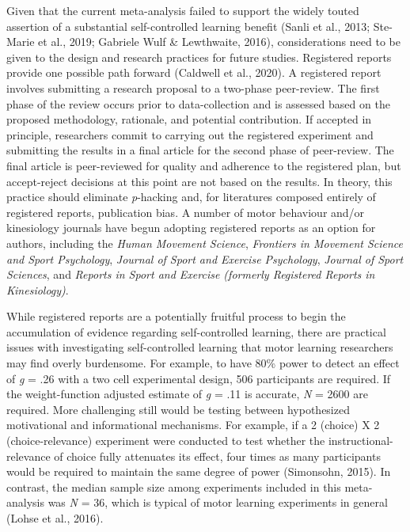 \documentclass[
  english,
  man,floatsintext]{apa7}
\begin{document}
Given that the current meta-analysis failed to support the widely touted assertion of a substantial self-controlled learning benefit (Sanli et al., 2013; Ste-Marie et al., 2019; Gabriele Wulf \& Lewthwaite, 2016), considerations need to be given to the design and research practices for future studies. Registered reports provide one possible path forward (Caldwell et al., 2020). A registered report involves submitting a research proposal to a two-phase peer-review. The first phase of the review occurs prior to data-collection and is assessed based on the proposed methodology, rationale, and potential contribution. If accepted in principle, researchers commit to carrying out the registered experiment and submitting the results in a final article for the second phase of peer-review. The final article is peer-reviewed for quality and adherence to the registered plan, but accept-reject decisions at this point are not based on the results. In theory, this practice should eliminate \emph{p}-hacking and, for literatures composed entirely of registered reports, publication bias. A number of motor behaviour and/or kinesiology journals have begun adopting registered reports as an option for authors, including the \emph{Human Movement Science}, \emph{Frontiers in Movement Science and Sport Psychology}, \emph{Journal of Sport and Exercise Psychology}, \emph{Journal of Sport Sciences}, and \emph{Reports in Sport and Exercise (formerly Registered Reports in Kinesiology)}.

While registered reports are a potentially fruitful process to begin the accumulation of evidence regarding self-controlled learning, there are practical issues with investigating self-controlled learning that motor learning researchers may find overly burdensome. For example, to have 80\% power to detect an effect of \emph{g} = .26 with a two cell experimental design, 506 participants are required. If the weight-function adjusted estimate of \emph{g} = .11 is accurate, \emph{N} = 2600 are required. More challenging still would be testing between hypothesized motivational and informational mechanisms. For example, if a 2 (choice) X 2 (choice-relevance) experiment were conducted to test whether the instructional-relevance of choice fully attenuates its effect, four times as many participants would be required to maintain the same degree of power (Simonsohn, 2015). In contrast, the median sample size among experiments included in this meta-analysis was \emph{N} = 36, which is typical of motor learning experiments in general (Lohse et al., 2016).
\end{document}
